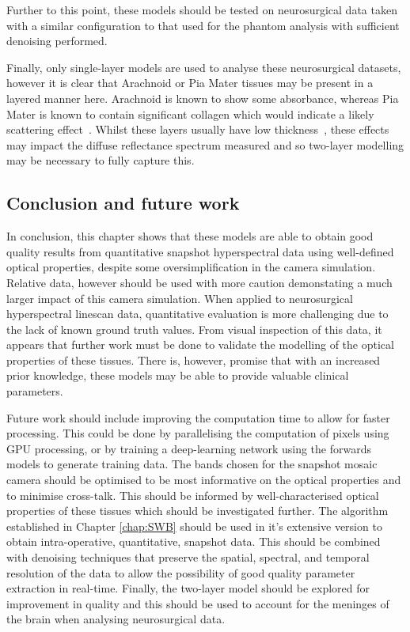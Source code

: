 Further to this point, these models should be tested on neurosurgical data taken with a similar configuration to that used for the phantom analysis with sufficient denoising performed. 

Finally, only single-layer models are used to analyse these neurosurgical datasets, however it is clear that Arachnoid or Pia Mater tissues may be present in a layered manner here. Arachnoid is known to show some absorbance, whereas Pia Mater is known to contain significant collagen which would indicate a likely scattering effect~\citep{Ghannam2023}. Whilst these layers usually have low thickness~\citep{Ghannam2023}, these effects may impact the diffuse reflectance spectrum measured and so two-layer modelling may be necessary to fully capture this. 

\subsection{Conclusion and future work}
In conclusion, this chapter shows that these models are able to obtain good quality results from quantitative snapshot hyperspectral data using well-defined optical properties, despite some oversimplification in the camera simulation. Relative data, however should be used with more caution demonstating a much larger impact of this camera simulation. When applied to neurosurgical hyperspectral linescan data, quantitative evaluation is more challenging due to the lack of known ground truth values. From visual inspection of this data, it appears that further work must be done to validate the modelling of the optical properties of these tissues. There is, however, promise that with an increased prior knowledge, these models may be able to provide valuable clinical parameters. 

Future work should include improving the computation time to allow for faster processing. This could be done by parallelising the computation of pixels using GPU processing, or by training a deep-learning network using the forwards models to generate training data. The bands chosen for the snapshot mosaic camera should be optimised to be most informative on the optical properties and to minimise cross-talk. This should be informed by well-characterised optical properties of these tissues which should be investigated further. The algorithm established in Chapter \ref{chap:SWB} should be used in it's extensive version to obtain intra-operative, quantitative, snapshot data. This should be combined with denoising techniques that preserve the spatial, spectral, and temporal resolution of the data to allow the possibility of good quality parameter extraction in real-time. Finally, the two-layer model should be explored for improvement in quality and this should be used to account for the meninges of the brain when analysing neurosurgical data. 

